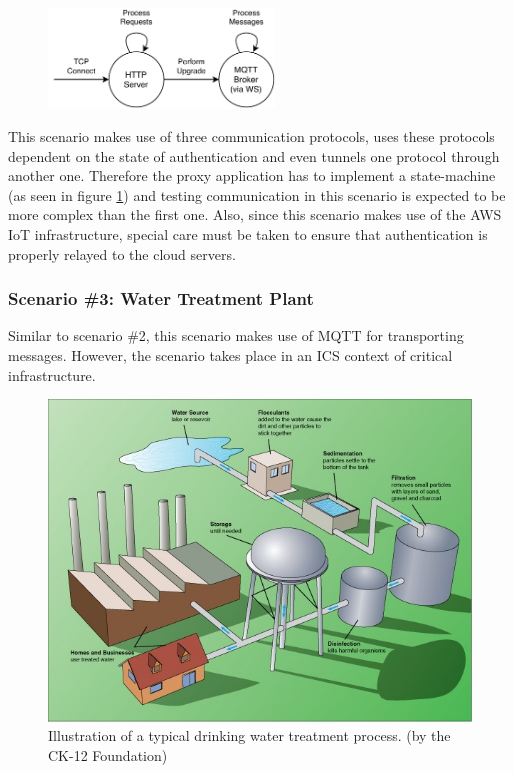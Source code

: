 \begin{figure}[h!]
    \centering
    \includegraphics[width=6cm]{img/ch04/Statemachine 2.pdf}
    \label{fig:aws-statemachine}
\end{figure}
This scenario makes use of three communication protocols, uses these protocols dependent on the state of authentication and even tunnels one protocol through another one. Therefore the proxy application has to implement a state-machine (as seen in figure \ref{fig:aws-statemachine}) and testing communication in this scenario is expected to be more complex than the first one. Also, since this scenario makes use of the \ac{AWS} \ac{IoT} infrastructure, special care must be taken to ensure that authentication is properly relayed to the cloud servers.


\subsubsection{Scenario \#3: Water Treatment Plant}
\label{par:scenario-3}Similar to scenario \#2, this scenario makes use of \ac{MQTT} for transporting messages. However, the scenario takes place in an \ac{ICS} context of critical infrastructure.

\begin{figure}[hb]
    \centering
    \includegraphics[width=12cm]{img/ch04/watertreatmentplant.png}
    \caption[Illustration of a typical drinking water treatment process. (by the CK-12 Foundation)]{Illustration of a typical drinking water treatment process. (by the CK-12 Foundation)\protect\footnotemark}
    \label{fig:water-treatment}
\end{figure}


